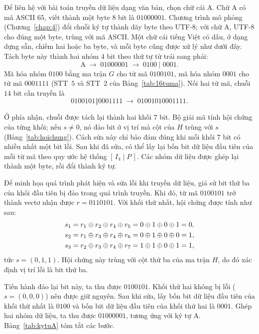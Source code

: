 Để liên hệ với bài toán truyền dữ liệu dạng văn bản, chọn chữ cái $\mathrm{A}$.
Chữ $\mathrm{A}$ có mã ASCII $65$, viết thành một byte $8$ bit là $01000001$.
Chương trình mô phỏng (Chương~\ref{chap:4}) đổi chuỗi ký tự thành dãy byte theo
UTF-8; với chữ $\mathrm{A}$, UTF-8 cho đúng một byte, trùng với mã ASCII. Một
chữ cái tiếng Việt có dấu, ở dạng dựng sẵn, chiếm hai hoặc ba byte, và mỗi byte cũng được xử lý
như dưới đây. Tách byte này thành hai nhóm $4$ bit theo thứ tự từ trái sang phải:
\[
  \mathrm{A} \;\to\; 01000001 \;\to\; 0100 \mid 0001 .
\]
Mã hóa nhóm $0100$ bằng ma trận $G$ cho từ mã $0100101$, mã hóa nhóm $0001$ cho
từ mã $0001111$ (STT~$5$ và STT~$2$ của Bảng~\ref{tab:16tuma}). Nối hai từ mã,
chuỗi $14$ bit cần truyền là
\[
  0100101 \mathbin{\Vert} 0001111 \;\to\; 01001010001111 .
\]

Ở phía nhận, chuỗi được tách lại thành hai khối $7$ bit. Bộ giải mã tính hội
chứng của từng khối; nếu $s \neq 0$, nó đảo bit ở vị trí mà cột của $H$ trùng
với $s$ (Bảng~\ref{tab:hoichung}). Cách sửa này chỉ bảo đảm đúng khi mỗi khối
$7$ bit có nhiều nhất một bit lỗi. Sau khi đã sửa, có thể lấy lại bốn bit dữ liệu đầu tiên của mỗi từ mã
theo quy ước hệ thống $[\,I_4 \mid P\,]$. Các nhóm dữ liệu được ghép lại thành
một byte, rồi đổi thành ký tự.

Để minh họa quá trình phát hiện và sửa lỗi khi truyền dữ liệu, giả sử bit thứ ba
của khối đầu tiên bị đảo trong quá trình truyền. Khi đó, từ mã $0100101$ trở
thành vectơ nhận được $r = 0110101$. Với khối thứ nhất, hội chứng được tính như
sau:
\begin{align*}
  s_1 &= r_1 \oplus r_2 \oplus r_4 \oplus r_5 = 0 \oplus 1 \oplus 0 \oplus 1 = 0,\\*
  s_2 &= r_1 \oplus r_3 \oplus r_4 \oplus r_6 = 0 \oplus 1 \oplus 0 \oplus 0 = 1,\\*
  s_3 &= r_2 \oplus r_3 \oplus r_4 \oplus r_7 = 1 \oplus 1 \oplus 0 \oplus 1 = 1,
\end{align*}
tức $s = (0,1,1)$. Hội chứng này trùng với cột thứ ba của ma trận $H$, do đó xác
định vị trí lỗi là bit thứ ba.

Tiến hành đảo lại bit này, ta thu được $0100101$. Khối thứ hai không bị lỗi
($s = (0,0,0)$) nên được giữ nguyên. Sau khi sửa, lấy bốn bit dữ liệu đầu tiên của
khối thứ nhất là $0100$ và bốn bit dữ liệu đầu tiên của khối thứ hai là $0001$.
Ghép hai nhóm dữ liệu, ta thu được $01000001$, tương ứng với ký tự $\mathrm{A}$.
Bảng~\ref{tab:kytuA} tóm tắt các bước.

